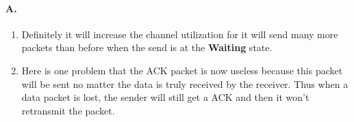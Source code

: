 \paragraph{A.}
\begin{enumerate}
	\item Definitely it will increase the channel utilization for it will send many more packets than before when the send is at the \textbf{Waiting} state.
	\item Here is one problem that the ACK packet is now useless because this packet will be sent no matter the data is truly received by the receiver. Thus when a data packet is lost, the sender will still get a ACK and then it won't retransmit the packet.
\end{enumerate}